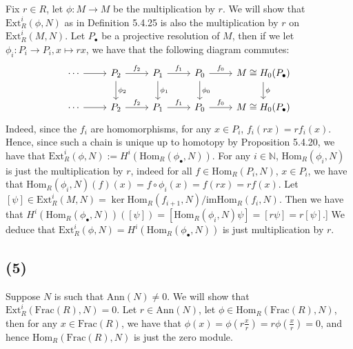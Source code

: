 \documentclass{article}
\newcommand{\Frac}{\mathrm{Frac}}
\newcommand{\Hom}[2]{\mathrm{Hom}_R(#1, #2)}
\newcommand{\Ext}{\mathrm{Ext}_R}
\newcommand{\im}{\mathrm{im}}
\newcommand{\Ann}{\mathrm{Ann}}
\begin{document}
Fix $r \in R$, let $\phi: M \to M$ be the multiplication by $r$.
We will show that $\Ext^i(\phi, N)$ as in Definition 5.4.25
is also the multiplication by $r$ on $\Ext^i(M, N)$.
Let $P_\bullet$ be a projective resolution of $M$,
then if we let $\phi_i: P_i \to P_i, x \mapsto rx$,
we have that the following diagram commutes:
\begin{equation*}
\begin{tikzcd}
\cdots \arrow[r] & P_2 \arrow[r, "f_2"] \arrow[d, "\phi_2"] & P_1 \arrow[r, "f_1"] \arrow[d, "\phi_1"] & P_0 \arrow[r, "f_0"] \arrow[d, "\phi_0"] & M\cong H_0(P_\bullet) \arrow[d, "\phi"] \\
\cdots \arrow[r] & P_2 \arrow[r, "f_2"]                     & P_1 \arrow[r, "f_1"]                     & P_0 \arrow[r, "f_0"]                     & M\cong H_0(P_\bullet)
\end{tikzcd}
\end{equation*}
Indeed, since the $f_i$ are homomorphisms, for any $x \in P_i$,
$f_i(rx) = rf_i(x)$. Hence, since such a chain is unique
up to homotopy by Proposition 5.4.20, we have that
$\Ext^i(\phi, N) := H^i(\Hom{\phi_\bullet}{N})$.
For any $i \in \mathbb{N}$, $\Hom{\phi_i}{N}$ is just the
multiplication by $r$, indeed for all $f \in \Hom{P_i}{N}$,
$x \in P_i$, we have that $\Hom{\phi_i}{N}(f)(x) = f\circ\phi_i(x)
= f(rx) = rf(x)$.
Let $[\psi] \in \Ext^i(M, N)
= \ker\Hom{f_{i+1}}{N}/\im\Hom{f_i}{N}$.
Then we have that
$H^i(\Hom{\phi_\bullet}{N})([\psi]) = [\Hom{\phi_i}{N}\psi]
= [r\psi] = r[\psi]$.]
We deduce that $\Ext^i(\phi, N) = H^i(\Hom{\phi_\bullet}{N})$
is just multiplication by $r$.

\subsection*{(5)}

Suppose $N$ is such that $\Ann(N) \neq 0$. 
We will show that $\Ext^i(\Frac(R), N) = 0$. Let $r \in \Ann(N)$,
let $\phi \in \Hom{\Frac(R)}{N}$, then for any $x \in \Frac(R)$,
we have that $\phi(x) = \phi(r\frac{x}{r})
= r\phi(\frac{x}{r}) =  0$, and hence $\Hom{\Frac(R)}{N}$ is just 
the zero module.
\end{document}
